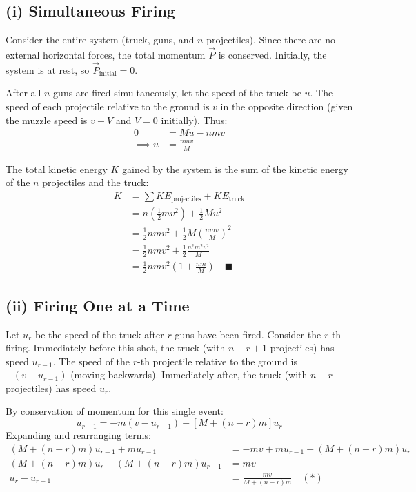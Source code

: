 \documentclass[12pt]{article}
\begin{document}
\subsection*{(i) Simultaneous Firing}
Consider the entire system (truck, guns, and $n$ projectiles). Since there are no external horizontal forces, the total momentum $\vec{P}$ is conserved.
Initially, the system is at rest, so $\vec{P}_{\text{initial}} = 0$.

After all $n$ guns are fired simultaneously, let the speed of the truck be $u$. The speed of each projectile relative to the ground is $v$ in the opposite direction (given the muzzle speed is $v-V$ and $V=0$ initially). Thus:
\begin{align*}
    0 &= Mu - nmv \\
    \implies u &= \frac{nmv}{M}
\end{align*}

The total kinetic energy $K$ gained by the system is the sum of the kinetic energy of the $n$ projectiles and the truck:
\begin{align*}
    K &= \sum KE_{\text{projectiles}} + KE_{\text{truck}} \\
    &= n\left( \frac{1}{2}mv^2 \right) + \frac{1}{2}Mu^2 \\
    &= \frac{1}{2}nmv^2 + \frac{1}{2}M\left( \frac{nmv}{M} \right)^2 \\
    &= \frac{1}{2}nmv^2 + \frac{1}{2}\frac{n^2m^2v^2}{M} \\
    &= \frac{1}{2}nmv^2 \left( 1 + \frac{nm}{M} \right) \quad \blacksquare
\end{align*}

\subsection*{(ii) Firing One at a Time}
Let $u_r$ be the speed of the truck after $r$ guns have been fired.
Consider the $r$-th firing. Immediately before this shot, the truck (with $n-r+1$ projectiles) has speed $u_{r-1}$. The speed of the $r$-th projectile relative to the ground is $-(v - u_{r-1})$ (moving backwards).
Immediately after, the truck (with $n-r$ projectiles) has speed $u_r$.

By conservation of momentum for this single event:
\begin{equation*}
    [M + (n-r+1)m]u_{r-1} = -m(v - u_{r-1}) + [M + (n-r)m]u_r
\end{equation*}
Expanding and rearranging terms:
\begin{align*}
    (M + (n-r)m)u_{r-1} + mu_{r-1} &= -mv + mu_{r-1} + (M + (n-r)m)u_r \\
    (M + (n-r)m)u_r - (M + (n-r)m)u_{r-1} &= mv \\
    u_r - u_{r-1} &= \frac{mv}{M + (n-r)m} \quad (*)
\end{align*}
\end{document}
